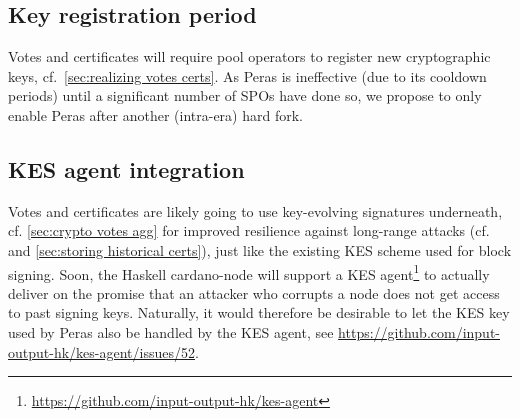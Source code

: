 
\subsection{Key registration period}

Votes and certificates will require pool operators to register new cryptographic keys, cf.\ \cref{sec:realizing votes certs}.
As Peras is ineffective (due to its cooldown periods) until a significant number of SPOs have done so, we propose to only enable Peras after another (intra-era) hard fork.

\subsection{KES agent integration}

Votes and certificates are likely going to use key-evolving signatures underneath, cf. \cref{sec:crypto votes agg} for improved resilience against long-range attacks (cf.\ \cite{david2018ouroboros} and \cref{sec:storing historical certs}), just like the existing KES scheme used for block signing.
Soon, the Haskell cardano-node will support a KES agent\footnote{\url{https://github.com/input-output-hk/kes-agent}} to actually deliver on the promise that an attacker who corrupts a node does not get access to past signing keys.
Naturally, it would therefore be desirable to let the KES key used by Peras also be handled by the KES agent, see \url{https://github.com/input-output-hk/kes-agent/issues/52}.

